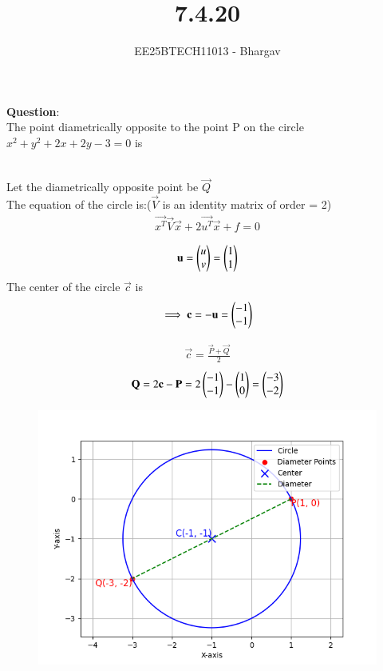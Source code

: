 \documentclass[journal]{IEEEtran}
\begin{document}

\vspace{3cm}

\title{7.4.20}
\author{EE25BTECH11013 - Bhargav}
\maketitle
    {\let\newpage\relax\maketitle}

\renewcommand{\thefigure}{\theenumi}
\renewcommand{\thetable}{\theenumi}
\setlength{\intextsep}{10pt} %

\renewcommand{\thetable}{\theenumi}

\textbf{Question}: \\
The point diametrically opposite to the point P  on the circle $x^2 +y^2 + 2x + 2y - 3 =  0$ is

\solution \\
Let the diametrically opposite point be $\vec{Q}$\\
The equation of the circle is:($\vec{V}$ is an identity matrix of order = 2)
\begin{align}
\vec{x^T}\vec{V}\vec{x} + 2\vec{u^T}\vec{x} + f = 0 
\end{align}

\begin{align}
\mathbf{u} = \begin{pmatrix}u \\ v\end{pmatrix} = \begin{pmatrix}1 \\ 1\end{pmatrix}
\end{align}
The center of the circle $\vec{c}$ is
\begin{align}
\implies \mathbf{c} = -\mathbf{u} = \begin{pmatrix}-1 \\ -1\end{pmatrix}
\end{align}

\begin{align}
\vec{c} = \frac{\vec{P}+\vec{Q}}{2}
\end{align}
\begin{align}
\mathbf{Q} = 2\mathbf{c} - \mathbf{P} = 2\begin{pmatrix}-1 \\ -1\end{pmatrix} - \begin{pmatrix}1 \\ 0\end{pmatrix} = \begin{pmatrix}-3 \\ -2\end{pmatrix}
\end{align}

\begin{figure}[h!]
    \centering
    \includegraphics[height=0.5\textheight, keepaspectratio]{figs/Figure_1.png}
    \label{figure_1}
\end{figure}
\end{document}
